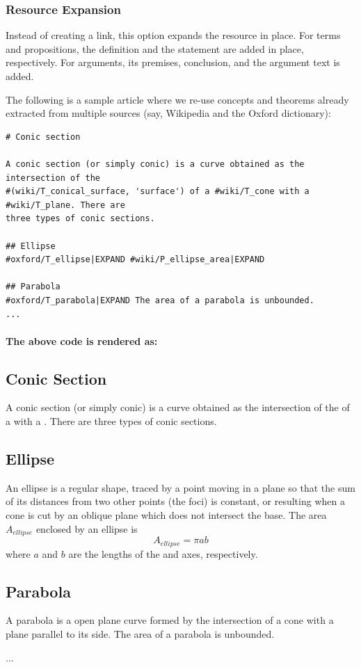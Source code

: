 \documentclass[a4paper]{article}
\begin{document}
\subsubsection{Resource Expansion}

Instead of creating a link, this option expands the resource in place. For terms and propositions, the definition and the statement are added in place, respectively. For arguments, its premises, conclusion, and the argument text is added.

The following is a sample article where we re-use concepts and theorems already extracted from multiple sources (say, Wikipedia and the Oxford dictionary):

\begin{verbatim}
# Conic section

A conic section (or simply conic) is a curve obtained as the intersection of the
#(wiki/T_conical_surface, 'surface') of a #wiki/T_cone with a #wiki/T_plane. There are
three types of conic sections.

## Ellipse
#oxford/T_ellipse|EXPAND #wiki/P_ellipse_area|EXPAND

## Parabola
#oxford/T_parabola|EXPAND The area of a parabola is unbounded.
...
\end{verbatim}

\paragraph{The above code is rendered as:}
\begin{mdframed}
\section*{Conic Section}
A conic section (or simply conic) is a curve obtained as the intersection of the  of a  with a . There are three types of conic sections.

\subsection*{Ellipse}
An ellipse is a regular  shape, traced by a point moving in a plane so that the sum of its distances from two other points (the foci) is constant, or resulting when a cone is cut by an oblique plane which does not intersect the base.  The area $A_{ellipse}$ enclosed by an ellipse is $$A_{ellipse} = \pi a b$$where $a$ and $b$ are the lengths of the  and  axes, respectively.

\subsection*{Parabola}
A parabola is a  open plane curve formed by the intersection of a cone with a plane parallel to its side. The area of a parabola is unbounded.

...

\end{mdframed}
\end{document}
